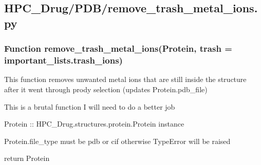 

\subsection{HPC\_Drug/PDB/remove\_trash\_metal\_ions.py}

    \subsubsection{Function remove\_trash\_metal\_ions(Protein, trash = important\_lists.trash\_ions)}
        This function removes unwanted metal ions
        that are still inside the structure after it went through prody
        selection (updates Protein.pdb\_file)

        This is a brutal function I will need to do a better job

        Protein :: HPC\_Drug.structures.protein.Protein instance

        Protein.file\_type must be pdb or cif otherwise TypeError will be raised

        return Protein